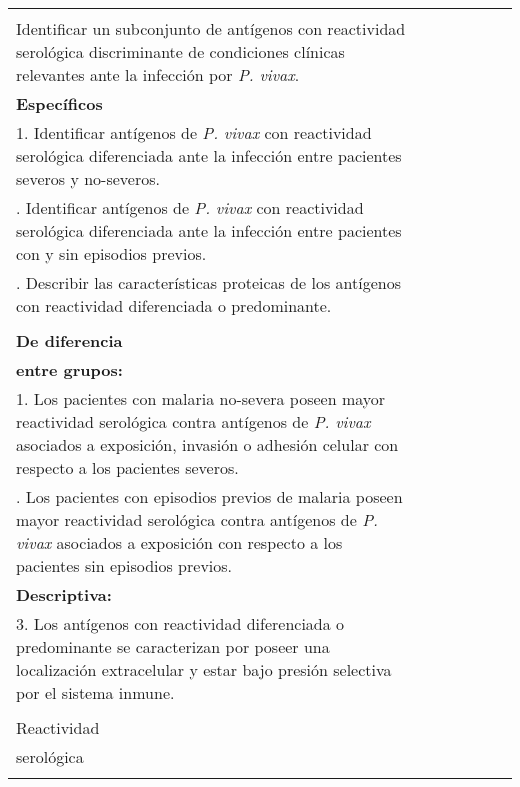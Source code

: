 {\begin{landscape}
\begin{center}
\begin{tabular}{|m{3.2cm}m{3.2cm}m{3.2cm}m{3.2cm}m{3.2cm}m{3.2cm}m{3.2cm}|}
\begin{minipage}{3.2cm}
  \end{minipage} 
  & 
  \begin{minipage}{3.2cm} 
  \textbf{General}\\
  Identificar un subconjunto de antígenos con reactividad serológica 
  discriminante de condiciones clínicas relevantes ante la infección por \textit{P. vivax}.\\
  \newline
  \textbf{Específicos}\\
  1. Identificar antígenos de \textit{P. vivax} con reactividad serológica 
  diferenciada ante la infección entre pacientes 
  severos y no-severos.\\
  \newline
  2. Identificar antígenos de \textit{P. vivax} con reactividad serológica 
  diferenciada ante la infección entre pacientes 
  con y sin episodios previos.\\
  \newline
  3. Describir las características proteicas de los antígenos con reactividad 
  diferenciada o predominante.\\
  \end{minipage} 
  & 
  \begin{minipage}{3.2cm} 
  .\\
  \textbf{De diferencia}\\ \textbf{entre grupos:}\\
  1. Los pacientes con malaria no-severa poseen 
  mayor reactividad serológica contra antígenos de \textit{P. vivax}
  asociados a exposición, invasión o adhesión celular
  con respecto a los pacientes severos.\\
  \newline
  2. Los pacientes con episodios previos de malaria poseen
  mayor reactividad serológica contra antígenos de \textit{P. vivax}
  asociados a exposición
  con respecto a los pacientes sin episodios previos.\\
  \newline
  \textbf{Descriptiva:}\\
  3. Los antígenos con reactividad diferenciada o predominante
  se caracterizan por poseer una localización extracelular 
  y estar bajo presión selectiva por el sistema inmune.\\
  \end{minipage} 
  &
  \begin{minipage}{3.2cm} 
  \textbf{Dependiente}\\ Reactividad\\ serológica\\

\end{minipage}
\end{tabular}
\end{center}
\end{landscape}}
